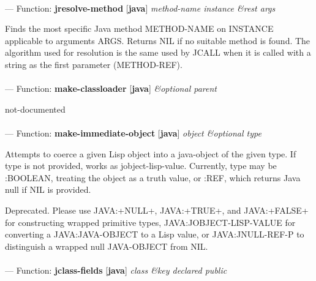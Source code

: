 \paragraph{}
\label{JAVA:JRESOLVE-METHOD}
--- Function: \textbf{jresolve-method} [\textbf{java}] \textit{method-name instance \&rest args}

\begin{adjustwidth}{5em}{5em}
Finds the most specific Java method METHOD-NAME on INSTANCE applicable to arguments ARGS. Returns NIL if no suitable method is found. The algorithm used for resolution is the same used by JCALL when it is called with a string as the first parameter (METHOD-REF).
\end{adjustwidth}

\paragraph{}
\label{JAVA:MAKE-CLASSLOADER}
--- Function: \textbf{make-classloader} [\textbf{java}] \textit{\&optional parent}

\begin{adjustwidth}{5em}{5em}
not-documented
\end{adjustwidth}

\paragraph{}
\label{JAVA:MAKE-IMMEDIATE-OBJECT}
--- Function: \textbf{make-immediate-object} [\textbf{java}] \textit{object \&optional type}

\begin{adjustwidth}{5em}{5em}
Attempts to coerce a given Lisp object into a java-object of the
given type.  If type is not provided, works as jobject-lisp-value.
Currently, type may be :BOOLEAN, treating the object as a truth value,
or :REF, which returns Java null if NIL is provided.

Deprecated.  Please use JAVA:+NULL+, JAVA:+TRUE+, and JAVA:+FALSE+ for
constructing wrapped primitive types, JAVA:JOBJECT-LISP-VALUE for converting a
JAVA:JAVA-OBJECT to a Lisp value, or JAVA:JNULL-REF-P to distinguish a wrapped
null JAVA-OBJECT from NIL.
\end{adjustwidth}

\paragraph{}
\label{JAVA:JCLASS-FIELDS}
--- Function: \textbf{jclass-fields} [\textbf{java}] \textit{class \&key declared public}

